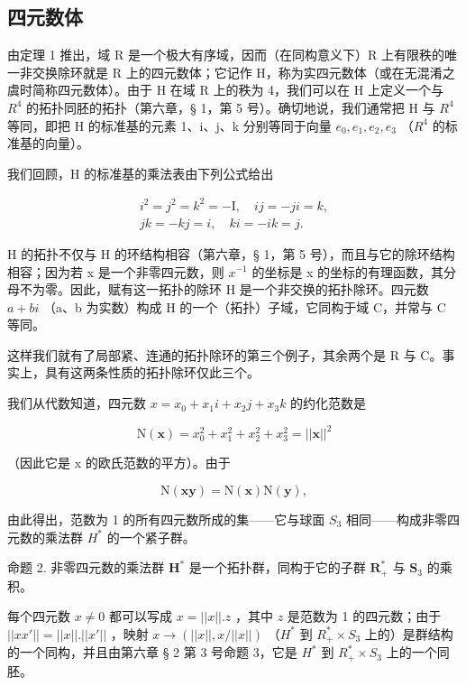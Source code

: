 \subsection{四元数体}

由定理 1 推出，域 R 是一个极大有序域，因而（在同构意义下）R 上有限秩的唯一非交换除环就是 R 上的四元数体；它记作 H，称为实四元数体（或在无混淆之虞时简称四元数体）。由于 H 在域 R 上的秩为 4，我们可以在 H 上定义一个与 \(R^{4}\) 的拓扑同胚的拓扑（第六章，§ 1，第 5 号）。确切地说，我们通常把 H 与 \(R^{4}\) 等同，即把 H 的标准基的元素 1、i、j、k 分别等同于向量 \(e_{0}, e_{1}, e_{2}, e_{3}\) （\(R^{4}\) 的标准基的向量）。

我们回顾，H 的标准基的乘法表由下列公式给出

\[
\begin{array}{c} i ^ {2} = j ^ {2} = k ^ {2} = - \mathrm{I}, \quad i j = - j i = k, \\ j k = - k j = i, \quad k i = - i k = j. \end{array}
\]

H 的拓扑不仅与 H 的环结构相容（第六章，§ 1，第 5 号），而且与它的除环结构相容；因为若 x 是一个非零四元数，则 \(x^{-1}\) 的坐标是 x 的坐标的有理函数，其分母不为零。因此，赋有这一拓扑的除环 H 是一个非交换的拓扑除环。四元数 \(a + bi\) （a、b 为实数）构成 H 的一个（拓扑）子域，它同构于域 C，并常与 C 等同。

这样我们就有了局部紧、连通的拓扑除环的第三个例子，其余两个是 R 与 C。事实上，具有这两条性质的拓扑除环仅此三个。

我们从代数知道，四元数 \(x = x_{0} + x_{1}i + x_{2}j + x_{3}k\) 的约化范数是

\[
\mathrm{N} (\boldsymbol {x}) = x _ {0} ^ {2} + x _ {1} ^ {2} + x _ {2} ^ {2} + x _ {3} ^ {2} = | | \boldsymbol {x} | | ^ {2}
\]

（因此它是 x 的欧氏范数的平方）。由于

\[
\mathrm{N} (\boldsymbol {x y}) = \mathrm{N} (\boldsymbol {x}) \mathrm{N} (\boldsymbol {y}),
\]

由此得出，范数为 1 的所有四元数所成的集——它与球面 \(S_{3}\) 相同——构成非零四元数的乘法群 \(H^{*}\) 的一个紧子群。

命题 2. 非零四元数的乘法群 \(\mathbf{H}^*\) 是一个拓扑群，同构于它的子群 \(\mathbf{R}_+^*\) 与 \(\mathbf{S}_3\) 的乘积。

每个四元数 \(x \neq 0\) 都可以写成 \(x = ||x||.z\) ，其中 \(z\) 是范数为 1 的四元数；由于 \(||xx'|| = ||x||.||x'||\) ，映射 \(x \to (||x||, x/||x||)\) （\(H^*\) 到 \(R_+^* \times S_3\) 上的）是群结构的一个同构，并且由第六章 § 2 第 3 号命题 3，它是 \(H^*\) 到 \(R_+^* \times S_3\) 上的一个同胚。

